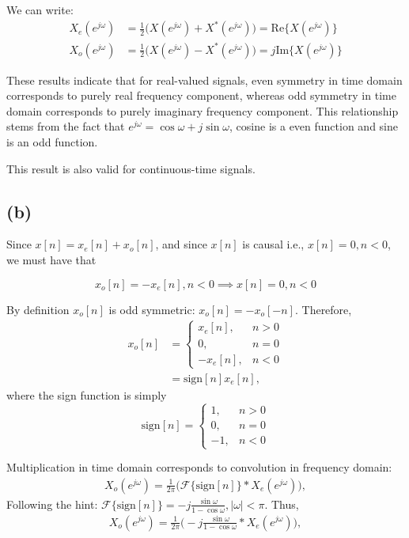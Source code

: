 \documentclass{article}
\begin{document}
We can write:
\begin{align}
	X_e(e^{j\omega}) &= \frac{1}{2}\Big(X(e^{j\omega}) + X^*(e^{j\omega})\Big) = \mathrm{Re}\{X(e^{j\omega})\} \\
	X_o(e^{j\omega}) &= \frac{1}{2}\Big(X(e^{j\omega}) - X^*(e^{j\omega})\Big) = j\mathrm{Im}\{X(e^{j\omega})\} 
\end{align}

These results indicate that for real-valued signals, even symmetry in time domain corresponds to purely real frequency component, whereas odd symmetry in time domain corresponds to purely imaginary frequency component. This relationship stems from the fact that $e^{j\omega} = \cos\omega + j\sin\omega$, cosine is a even function and sine is an odd function.

This result is also valid for continuous-time signals.
\subsection{(b)}

Since $x[n] = x_e[n] + x_o[n]$, and since $x[n]$ is causal i.e., $x[n] = 0, n < 0$, we must have that

\begin{equation}
x_o[n] = -x_e[n], n < 0 \implies x[n] = 0, n < 0
\end{equation}

By definition $x_o[n]$ is odd symmetric: $x_o[n] = -x_o[-n]$. Therefore,
\begin{align} \nonumber
x_o[n] &= \begin{cases}
x_e[n], &n > 0 \\
0, & n = 0 \\
-x_e[n], &n < 0
\end{cases} \\
&= \mathrm{sign}[n]x_e[n],
\end{align}
where the sign function is simply
\begin{equation}
\mathrm{sign}[n] = \begin{cases}
1, &n > 0 \\
0, & n = 0 \\
-1, & n < 0
\end{cases}
\end{equation}

Multiplication in time domain corresponds to convolution in frequency domain:
\begin{align}
X_o(e^{j\omega}) = \frac{1}{2\pi}\Big(\mathcal{F}\{\mathrm{sign}[n]\}\ast X_e(e^{j\omega})\Big),
\end{align}
Following the hint: $\mathcal{F}\{\mathrm{sign}[n]\} = -j\frac{\sin\omega}{1-\cos\omega}, |\omega| < \pi$. Thus, 
\begin{align}
X_o(e^{j\omega}) = \frac{1}{2\pi}\Big(-j\frac{\sin\omega}{1-\cos\omega}\ast X_e(e^{j\omega})\Big),
\end{align}
\end{document}
